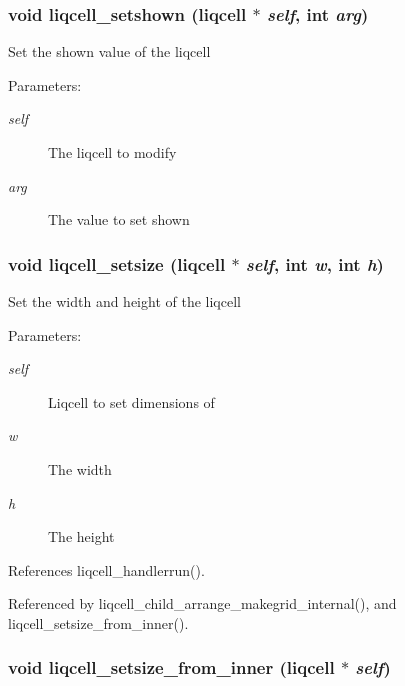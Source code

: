 \subsubsection[{liqcell\_\-setshown}]{\setlength{\rightskip}{0pt plus 5cm}void liqcell\_\-setshown (liqcell $\ast$ {\em self}, \/  int {\em arg})}\label{d5/da2/liqcell_8c_10dd73affd3e1d95561b954075c86a79}


Set the shown value of the liqcell \begin{Desc}
\item[Parameters:]
\begin{description}
\item[{\em self}]The liqcell to modify \item[{\em arg}]The value to set shown \end{description}
\end{Desc}
\subsubsection[{liqcell\_\-setsize}]{\setlength{\rightskip}{0pt plus 5cm}void liqcell\_\-setsize (liqcell $\ast$ {\em self}, \/  int {\em w}, \/  int {\em h})}\label{d5/da2/liqcell_8c_37635b6dfd9e0332df3373a0d4be3b40}


Set the width and height of the liqcell \begin{Desc}
\item[Parameters:]
\begin{description}
\item[{\em self}]Liqcell to set dimensions of \item[{\em w}]The width \item[{\em h}]The height \end{description}
\end{Desc}


References liqcell\_\-handlerrun().

Referenced by liqcell\_\-child\_\-arrange\_\-makegrid\_\-internal(), and liqcell\_\-setsize\_\-from\_\-inner().
\subsubsection[{liqcell\_\-setsize\_\-from\_\-inner}]{\setlength{\rightskip}{0pt plus 5cm}void liqcell\_\-setsize\_\-from\_\-inner (liqcell $\ast$ {\em self})}\label{d5/da2/liqcell_8c_d8232089321484c557d1dc25950fd7e3}


